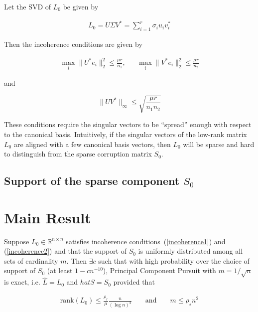 \documentclass{../common/projectreport}
\begin{document}
Let the SVD of $L_0$ be given by

\begin{align}
L_0 = U\Sigma V^* = \sum_{i=1}^r \sigma_i u_i v_i^*
\end{align}

Then the incoherence conditions are given by

\begin{equation}
\begin{aligned}
\max_i \|U^*e_i\|_2^2 \leq \frac{\mu r}{n_1}, && \max_i \|V^*e_i\|_2^2 \leq \frac{\mu r}{n_2}
\label{incoherence1}
\end{aligned}
\end{equation}

and

\begin{equation}
\| U V^* \|_\infty \leq \sqrt{\frac{\mu r}{n_1 n_2}} \label{incoherence2}
\end{equation}

These conditions require the singular vectors to be ``spread'' enough with respect to the canonical basis. Intuitively, if the singular vectors of the low-rank matrix $L_0$ are aligned with a few canonical basis vectors, then $L_0$ will be sparse and hard to distinguish from the sparse corruption matrix $S_0$.


\subsection{Support of the sparse component $S_0$}

\section{Main Result}
\begin{theorem}
Suppose $L_0 \in \mathbb{R}^{n \times n}$ satisfies incoherence conditions~(\ref{incoherence1}) and (\ref{incoherence2}) and that the support of $S_0$ is uniformly distributed among all sets of cardinality $m$. Then $\exists c$ such that with high probability over the choice of support of $S_0$ (at least $1-cn^{-10}$), Principal Component Pursuit with $m = 1/\sqrt{n}$ is exact, i.e. $\hat{L} = L_0$ and $hat{S} = S_0$ provided that

\begin{equation}
\begin{aligned}
\text{rank}(L_0) \leq \frac{\rho_r}{\mu} \frac{n}{(\log n)^2} && \text{ and } && m \leq \rho_s n^2
\end{aligned}
\end{equation}

\end{theorem}
\end{document}
